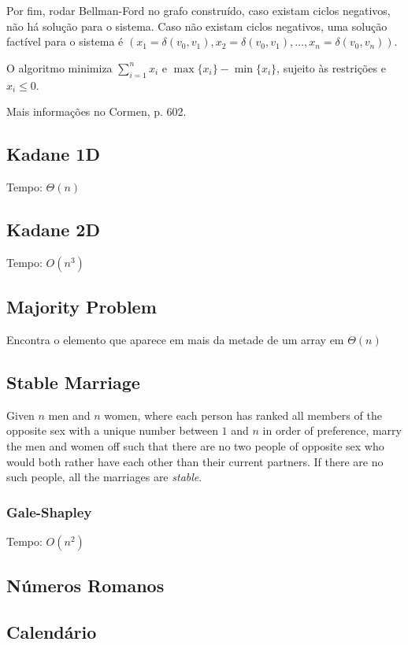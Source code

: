 \documentclass[12pt,a4paper]{article}
\begin{document}
			Por fim, rodar Bellman-Ford no grafo construído, caso existam ciclos negativos, não há solução para o sistema. Caso não existam ciclos negativos, uma solução factível para o sistema é $(x_1 = \delta(v_0, v_1), x_2 = \delta(v_0, v_1), \ldots, x_n = \delta(v_0, v_n))$.

			O algoritmo minimiza $\sum_{i=1}^n x_i$ e $\max\{x_i\} - \min\{x_i\}$, sujeito às restrições e $x_i \leq 0$.

			Mais informações no Cormen, p. 602.
		\subsection{Kadane 1D}
			Tempo: \(\Theta(n)\)
			
		\subsection{Kadane 2D}
			Tempo: \(O(n^3)\)
			
		\subsection{Majority Problem}
			Encontra o elemento que aparece em mais da metade de um array em \(\Theta(n)\)
			
		\subsection{Stable Marriage}
			Given $n$ men and $n$ women, where each person has ranked all members of the opposite sex with a unique number between $1$ and $n$ in order of preference, marry the men and women off such that there are no two people of opposite sex who would both rather have each other than their current partners. If there are no such people, all the marriages are \emph{stable}.
			\subsubsection{Gale-Shapley}
				Tempo: \(O(n^2)\)
				
		\subsection{Números Romanos}
			
		\subsection{Calendário}
			
\end{document}
